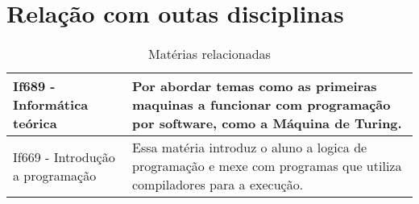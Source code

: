 \documentclass[10pt]{article}
\begin{document}
\section{Relação com outas disciplinas }

\begin{table}[h]
\centering 
\begin{tabular}{|p{7.0cm}|p{7.0cm}|}
\hline
If689 - Informática teórica & Por abordar temas como as primeiras maquinas a funcionar com programação por software, como a Máquina de Turing. \\ \hline
If669 - Introdução a programação & Essa matéria introduz o aluno a logica de programação e mexe com programas que utiliza compiladores para a execução. \\ \hline
\end{tabular}
\caption{Matérias relacionadas}
\end{table}




\citep{1, 2, 3, 4, 5}
\end{document}
